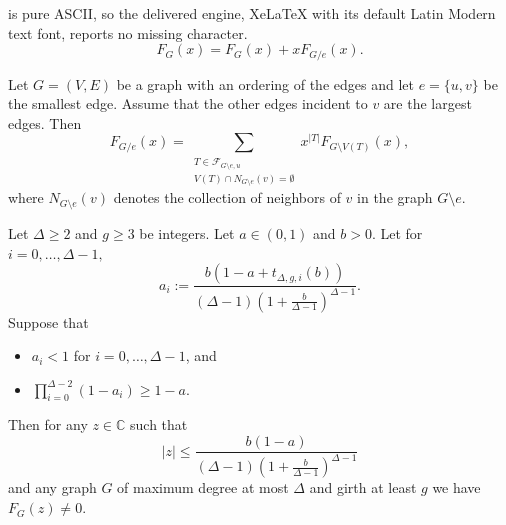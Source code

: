 \documentclass[10pt,a4paper]{amsart}
\begin{document}
is pure ASCII, so the delivered engine, XeLaTeX with its default Latin Modern text font, reports no missing character.
\begin{equation}\label{eq:deletion/contraction F}
    F_G(x)=F_G(x)+xF_{G/e}(x).
\end{equation}

\begin{lemma}\label{lem:expand G/e}
Let $G=(V,E)$ be a graph with an ordering of the edges and let $e=\{u,v\}$ be the smallest edge. Assume that the other edges incident to $v$ are the largest edges.   
Then
\begin{equation}\label{eq:contraction recurrence}
F_{G/e}(x)=\sum_{\substack{T\in \mathcal{F}_{G\setminus e,u}\\ V(T)\cap N_{G\setminus e}(v)=\emptyset}}x^{|T|}F_{G\setminus V(T)}(x),    
\end{equation}
where $N_{G\setminus e}(v)$ denotes the collection of neighbors of $v$ in the graph $G\setminus e$.
\end{lemma}

\begin{theorem}\label{thm:main general}
Let $\Delta\geq 2$ and $g\geq 3$ be integers. 
Let $a\in (0,1)$ and $b>0$. 
Let for $i=0,\ldots,\Delta-1,$
\begin{equation}\label{eq:define a_i}
    a_i:=\frac{b\left(1-a+ t_{\Delta,g,i}(b)\right)}{(\Delta-1) \left(1+\tfrac{b}{\Delta-1}\right)^{\Delta-1}}.
\end{equation}
Suppose that
\begin{itemize}
    \item $a_i<1$ for $i=0,\ldots,\Delta-1$, and
    \item $\prod_{i=0}^{\Delta-2}(1-a_i)\geq 1-a$.
\end{itemize}
Then for any $z\in \mathbb{C}$ such that 
\[|z|\leq \frac{b(1-a)}{(\Delta-1)(1+\tfrac{b}{\Delta-1})^{\Delta-1}}\]
and any graph $G$ of maximum degree at most $\Delta$ and girth at least $g$ we have $F_G(z)\neq 0$.
\end{theorem}
\end{document}

